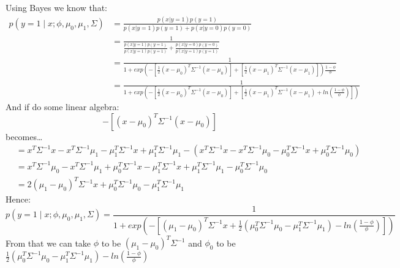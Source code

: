 \begin{answer}
    Using Bayes we know that:
    $$
        \begin{aligned}
            p(y = 1\mid x; \phi, \mu_0, \mu_1, \Sigma) & = \frac{p(x|y=1)p(y=1)}{p(x|y=1)p(y=1) + p(x|y=0)p(y=0)}                                                                                        \\
                                                       & = \frac{1}{\frac{p(x|y=1)p(y=1)}{p(x|y=1)p(y=1)} + \frac{p(x|y=0)p(y=0)}{p(x|y=1)p(y=1)}}                                                       \\
                                                       & = \frac{1}{1+exp(-[\frac{1}{2}(x-\mu_{0})^T \Sigma^{-1} (x-\mu_{0})]+[\frac{1}{2}(x-\mu_1)^T \Sigma^{-1} (x-\mu_1)])\frac{1-\phi}{\phi}}        \\
                                                       & = \frac{1}{1+exp(-[\frac{1}{2}(x-\mu_{0})^T \Sigma^{-1} (x-\mu_{0})]+[\frac{1}{2}(x-\mu_1)^T \Sigma^{-1} (x-\mu_1) + ln(\frac{1-\phi}{\phi})])}
        \end{aligned}
    $$
    And if do some linear algebra:
    \begin{equation}
        [(x-\mu_1)^T \Sigma^{-1} (x-\mu_1)]-[(x-\mu_{0})^T \Sigma^{-1} (x-\mu_{0})]
    \end{equation}
    becomes\dots
    $$
    \begin{aligned}
        &=x^T\Sigma^{-1}x - x^T\Sigma^{-1}\mu_1 -\mu_1^T\Sigma^{-1}x +\mu_1^T\Sigma^{-1}\mu_1 - (x^T\Sigma^{-1}x - x^T\Sigma^{-1}\mu_0 -\mu_0^T\Sigma^{-1}x +\mu_0^T\Sigma^{-1}\mu_0)\\
        &= x^T\Sigma^{-1}\mu_0-x^T\Sigma^{-1}\mu_1 + \mu_0^T\Sigma^{-1}x - \mu_1^T\Sigma^{-1}x + \mu_1^T\Sigma^{-1}\mu_1 - \mu_0^T\Sigma^{-1}\mu_0\\
        &= 2(\mu_1 - \mu_0)^T\Sigma^{-1}x + \mu_0^T\Sigma^{-1}\mu_0 - \mu_1^T\Sigma^{-1}\mu_1
    \end{aligned}
    $$
    Hence:
    $$p(y = 1\mid x; \phi, \mu_0, \mu_1, \Sigma) = \frac{1}{1+exp(-[(\mu_1 - \mu_0)^T\Sigma^{-1}x + \frac{1}{2}(\mu_0^T\Sigma^{-1}\mu_0 - \mu_1^T\Sigma^{-1}\mu_1)-ln(\frac{1-\phi}{\phi})])}$$
    From that we can take $\phi$ to be $(\mu_1 - \mu_0)^T\Sigma^{-1}$ and $\phi_0$ to be $\frac{1}{2}(\mu_0^T\Sigma^{-1}\mu_0 - \mu_1^T\Sigma^{-1}\mu_1)-ln(\frac{1-\phi}{\phi})$
\end{answer}
